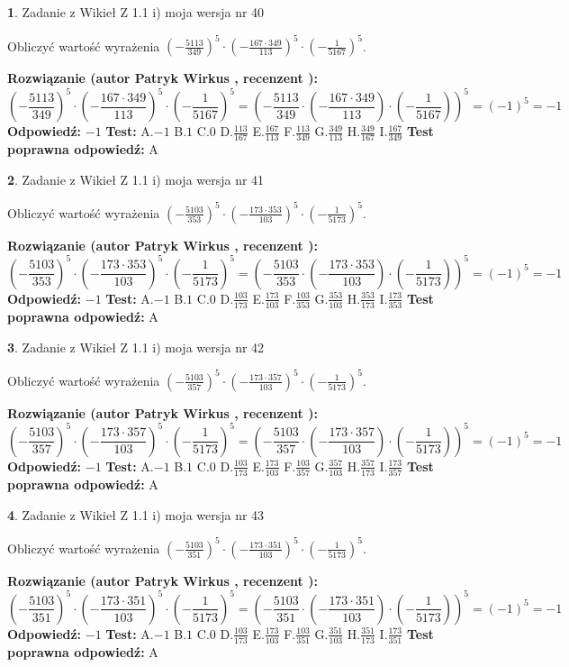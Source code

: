 \documentclass[12pt, a4paper]{article}
\theoremstyle{definition} %
\newtheorem{zad}{}
\newcommand{\zadStart}[1]{\begin{zad}#1\newline}
\newcommand{\zadStop}{\end{zad}}
\newcommand{\rozwStart}[2]{\noindent \textbf{Rozwiązanie (autor #1 , recenzent #2): }\newline}
\newcommand{\rozwStop}{\newline}
\newcommand{\odpStart}{\noindent \textbf{Odpowiedź:}\newline}
\newcommand{\odpStop}{\newline}
\newcommand{\testStart}{\noindent \textbf{Test:}\newline}
\newcommand{\testStop}{\newline}
\newcommand{\kluczStart}{\noindent \textbf{Test poprawna odpowiedź:}\newline}
\newcommand{\kluczStop}{\newline}
\begin{document}
\zadStart{Zadanie z Wikieł Z 1.1 i) moja wersja nr 40}

Obliczyć wartość wyrażenia $(-\frac{5113}{349})^{5} \cdot (-\frac{167 \cdot 349}{113})^{5} \cdot (-\frac{1}{5167})^{5}$.
\zadStop
\rozwStart{Patryk Wirkus}{}
$$(-\frac{5113}{349})^{5} \cdot (-\frac{167 \cdot 349}{113})^{5} \cdot (-\frac{1}{5167})^{5} = (-\frac{5113}{349} \cdot (-\frac{167 \cdot 349}{113}) \cdot (-\frac{1}{5167}))^{5} = (-1)^{5} = -1$$
\rozwStop
\odpStart
$-1$
\odpStop
\testStart
A.$-1$ B.$1$ C.$0$ D.$\frac{113}{167}$ E.$\frac{167}{113}$
F.$\frac{113}{349}$ G.$\frac{349}{113}$
H.$\frac{349}{167}$
I.$\frac{167}{349}$
\testStop
\kluczStart
A
\kluczStop



\zadStart{Zadanie z Wikieł Z 1.1 i) moja wersja nr 41}

Obliczyć wartość wyrażenia $(-\frac{5103}{353})^{5} \cdot (-\frac{173 \cdot 353}{103})^{5} \cdot (-\frac{1}{5173})^{5}$.
\zadStop
\rozwStart{Patryk Wirkus}{}
$$(-\frac{5103}{353})^{5} \cdot (-\frac{173 \cdot 353}{103})^{5} \cdot (-\frac{1}{5173})^{5} = (-\frac{5103}{353} \cdot (-\frac{173 \cdot 353}{103}) \cdot (-\frac{1}{5173}))^{5} = (-1)^{5} = -1$$
\rozwStop
\odpStart
$-1$
\odpStop
\testStart
A.$-1$ B.$1$ C.$0$ D.$\frac{103}{173}$ E.$\frac{173}{103}$
F.$\frac{103}{353}$ G.$\frac{353}{103}$
H.$\frac{353}{173}$
I.$\frac{173}{353}$
\testStop
\kluczStart
A
\kluczStop



\zadStart{Zadanie z Wikieł Z 1.1 i) moja wersja nr 42}

Obliczyć wartość wyrażenia $(-\frac{5103}{357})^{5} \cdot (-\frac{173 \cdot 357}{103})^{5} \cdot (-\frac{1}{5173})^{5}$.
\zadStop
\rozwStart{Patryk Wirkus}{}
$$(-\frac{5103}{357})^{5} \cdot (-\frac{173 \cdot 357}{103})^{5} \cdot (-\frac{1}{5173})^{5} = (-\frac{5103}{357} \cdot (-\frac{173 \cdot 357}{103}) \cdot (-\frac{1}{5173}))^{5} = (-1)^{5} = -1$$
\rozwStop
\odpStart
$-1$
\odpStop
\testStart
A.$-1$ B.$1$ C.$0$ D.$\frac{103}{173}$ E.$\frac{173}{103}$
F.$\frac{103}{357}$ G.$\frac{357}{103}$
H.$\frac{357}{173}$
I.$\frac{173}{357}$
\testStop
\kluczStart
A
\kluczStop



\zadStart{Zadanie z Wikieł Z 1.1 i) moja wersja nr 43}

Obliczyć wartość wyrażenia $(-\frac{5103}{351})^{5} \cdot (-\frac{173 \cdot 351}{103})^{5} \cdot (-\frac{1}{5173})^{5}$.
\zadStop
\rozwStart{Patryk Wirkus}{}
$$(-\frac{5103}{351})^{5} \cdot (-\frac{173 \cdot 351}{103})^{5} \cdot (-\frac{1}{5173})^{5} = (-\frac{5103}{351} \cdot (-\frac{173 \cdot 351}{103}) \cdot (-\frac{1}{5173}))^{5} = (-1)^{5} = -1$$
\rozwStop
\odpStart
$-1$
\odpStop
\testStart
A.$-1$ B.$1$ C.$0$ D.$\frac{103}{173}$ E.$\frac{173}{103}$
F.$\frac{103}{351}$ G.$\frac{351}{103}$
H.$\frac{351}{173}$
I.$\frac{173}{351}$
\testStop
\kluczStart
A
\kluczStop
\end{document}
